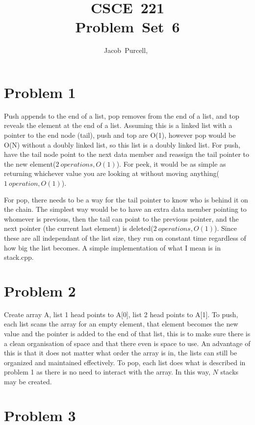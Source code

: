 \documentclass[journal]{IEEEtran}
\begin{document}
\title{CSCE~221 \\ Problem~Set~6}

\author{Jacob~Purcell,~}

\maketitle
\section*{Problem 1}
Push appends to the end of a list, pop removes from the end of a list, and 
top reveals the element at the end of a list. Assuming this is a linked list 
with a pointer to the end node (tail), push and top are O(1), however pop 
would be O(N) without a doubly linked list, so this list is a doubly linked list.
For push, have the tail node point to the next data member and reassign the 
tail pointer to the new element($2~operations, O(1)$). For peek, it would be as simple as returning whichever
value you are looking at without moving anything($1~operation, O(1)$). 

For pop, there needs to be a way for 
the tail pointer to know who is behind it on the chain. The simplest way would be to 
have an extra data member pointing to whomever is previous, then the tail can point to 
the previous pointer, and the next pointer (the current last element) is deleted($2~operations, O(1)$). 
Since these are all independant of the list size, they run on constant time regardless of how big the 
list becomes. A simple implementation of what I mean is in stack.cpp.

\section*{Problem 2}
Create array A, list 1 head points to A[0], list 2 head points to A[1]. To push, each list scans the array for 
an empty element, that element becomes the new value and the pointer is added to the end of that list, this is 
to make sure there is a clean organisation of space and that there even is space to use. An advantage of this 
is that it does not matter what order the array is in, the lists can still be organized and maintained effectively. 
To pop, each list does what is described in problem 1 as there is no need to interact with the array. In this way, 
$N$ stacks may be created.


\section*{Problem 3}
\end{document}
